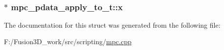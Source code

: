 \subsubsection[{x}]{$\ast$ mpc\+\_\+pdata\+\_\+apply\+\_\+to\+\_\+t\+::x}\label{structmpc__pdata__apply__to__t_a166928efe0b51b7dc9ca9229dbd701b2}


The documentation for this struct was generated from the following file\+:\begin{DoxyCompactItemize}
\item 
F\+:/\+Fusion3\+D\+\_\+work/src/scripting/\hyperlink{mpc_8cpp}{mpc.\+cpp}\end{DoxyCompactItemize}
